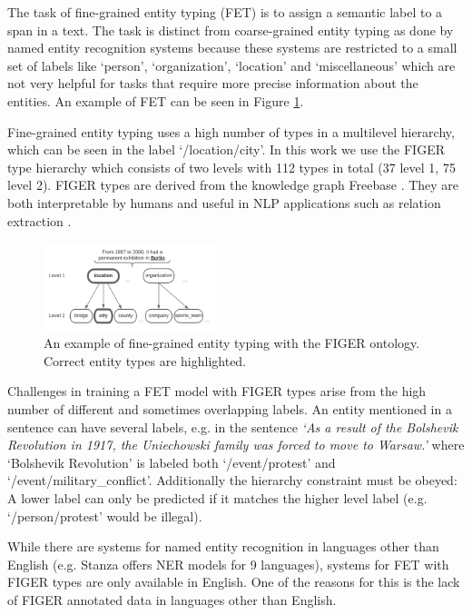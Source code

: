 \documentclass[11pt,a4paper]{article}
\begin{document}
The task of fine-grained entity typing (FET) is to assign a semantic label to a span in a text. The task is distinct from coarse-grained entity typing as done by named entity recognition systems because these systems are restricted to a small set of labels like `person', `organization', `location' and `miscellaneous' which are not very helpful for tasks that require more precise information about the entities. An example of FET can be seen in Figure \ref{figure:ex}.


Fine-grained entity typing uses a high number of types in a multilevel hierarchy, which can be seen in the label `/location/city'. In this work we use the FIGER type hierarchy which consists of two levels with 112 types in total (37 level 1, 75 level 2). FIGER types are derived from the knowledge graph Freebase \cite{bollacker2008freebase}. They are both interpretable by humans and useful in NLP applications such as relation extraction \citep{kuang2020improving}. 

\begin{figure}[t]

\centering
\includegraphics[width=0.45\textwidth]{diagram.png}
\caption{An example of fine-grained entity typing with the FIGER ontology. Correct entity types are highlighted.}
\label{figure:ex}
\end{figure}

Challenges in training a FET model with FIGER types arise from the high number of different and sometimes overlapping labels. An entity mentioned in a sentence can have several labels, e.g. in the sentence \textit{`As a result of the Bolshevik Revolution in 1917, the Uniechowski family was forced to move to Warsaw.'}  where `Bolshevik Revolution' is labeled both `/event/protest' and `/event/military\_conflict'. Additionally the hierarchy constraint must be obeyed: A lower label can only be predicted if it matches the higher level label (e.g. `/person/protest' would be illegal).

While there are systems for named entity recognition in languages other than English (e.g. Stanza \citet{qi2020stanza} offers NER models for 9 languages), systems for FET with FIGER types are only available in English. One of the reasons for this is the lack of FIGER annotated data in languages other than English.
\end{document}
